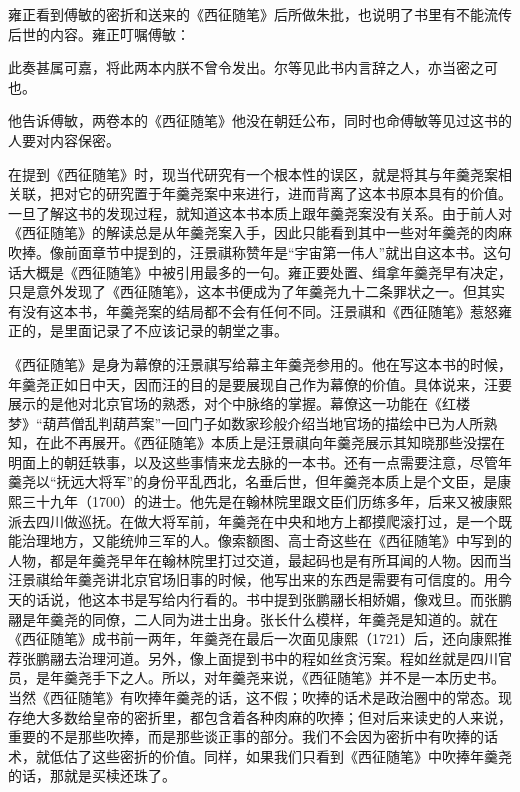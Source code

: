 
雍正看到傅敏的密折和送来的《西征随笔》后所做朱批，也说明了书里有不能流传后世的内容。雍正叮嘱傅敏：



\begin{bookquote}此奏甚属可嘉，将此两本内朕不曾令发出。尔等见此书内言辞之人，亦当密之可也。\end{bookquote}


他告诉傅敏，两卷本的《西征随笔》他没在朝廷公布，同时也命傅敏等见过这书的人要对内容保密。



在提到《西征随笔》时，现当代研究有一个根本性的误区，就是将其与年羹尧案相关联，把对它的研究置于年羹尧案中来进行，进而背离了这本书原本具有的价值。一旦了解这书的发现过程，就知道这本书本质上跟年羹尧案没有关系。由于前人对《西征随笔》的解读总是从年羹尧案入手，因此只能看到其中一些对年羹尧的肉麻吹捧。像前面章节中提到的，汪景祺称赞年是“宇宙第一伟人”就出自这本书。这句话大概是《西征随笔》中被引用最多的一句。雍正要处置、缉拿年羹尧早有决定，只是意外发现了《西征随笔》，这本书便成为了年羹尧九十二条罪状之一。但其实有没有这本书，年羹尧案的结局都不会有任何不同。汪景祺和《西征随笔》惹怒雍正的，是里面记录了不应该记录的朝堂之事。



《西征随笔》是身为幕僚的汪景祺写给幕主年羹尧参用的。他在写这本书的时候，年羹尧正如日中天，因而汪的目的是要展现自己作为幕僚的价值。具体说来，汪要展示的是他对北京官场的熟悉，对个中脉络的掌握。幕僚这一功能在《红楼梦》“葫芦僧乱判葫芦案”一回门子如数家珍般介绍当地官场的描绘中已为人所熟知，在此不再展开。《西征随笔》本质上是汪景祺向年羹尧展示其知晓那些没摆在明面上的朝廷轶事，以及这些事情来龙去脉的一本书。还有一点需要注意，尽管年羹尧以“抚远大将军”的身份平乱西北，名垂后世，但年羹尧本质上是个文臣，是康熙三十九年（1700）的进士。他先是在翰林院里跟文臣们历练多年，后来又被康熙派去四川做巡抚。在做大将军前，年羹尧在中央和地方上都摸爬滚打过，是一个既能治理地方，又能统帅三军的人。像索额图、高士奇这些在《西征随笔》中写到的人物，都是年羹尧早年在翰林院里打过交道，最起码也是有所耳闻的人物。因而当汪景祺给年羹尧讲北京官场旧事的时候，他写出来的东西是需要有可信度的。用今天的话说，他这本书是写给内行看的。书中提到张鹏翮长相娇媚，像戏旦。而张鹏翮是年羹尧的同僚，二人同为进士出身。张长什么模样，年羹尧是知道的。就在《西征随笔》成书前一两年，年羹尧在最后一次面见康熙（1721）后，还向康熙推荐张鹏翮去治理河道。另外，像上面提到书中的程如丝贪污案。程如丝就是四川官员，是年羹尧手下之人。所以，对年羹尧来说，《西征随笔》并不是一本历史书。当然《西征随笔》有吹捧年羹尧的话，这不假；吹捧的话术是政治圈中的常态。现存绝大多数给皇帝的密折里，都包含着各种肉麻的吹捧；但对后来读史的人来说，重要的不是那些吹捧，而是那些谈正事的部分。我们不会因为密折中有吹捧的话术，就低估了这些密折的价值。同样，如果我们只看到《西征随笔》中吹捧年羹尧的话，那就是买椟还珠了。



